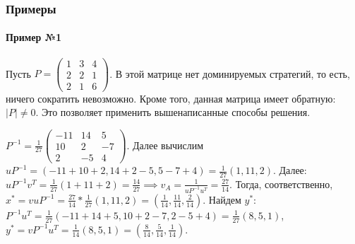 \documentclass{article}
\begin{document}
\subsubsection{Примеры}

\paragraph{Пример №1} Пусть $P = \begin{pmatrix}
    1 & 3 & 4 \\
    2 & 2 & 1 \\
    2 & 1 & 6
\end{pmatrix}$. В этой матрице нет доминируемых стратегий, то есть, ничего сократить невозможно. Кроме того, данная матрица имеет обратную: $|P| \ne 0$. Это позволяет применить вышенаписанные способы решения.

$P^{-1} = \frac{1}{27} \begin{pmatrix}
    -11 & 14 & 5 \\
    10 & 2 & -7 \\
    2 & -5 & 4
\end{pmatrix}$. Далее вычислим $u P^{-1} = (-11 + 10 + 2, 14 + 2 - 5, 5 - 7 + 4) = \frac{1}{27} (1, 11, 2)$. Далее: $u P^{-1} v^{T} = \frac{1}{27} (1 + 11 + 2) = \frac{14}{27} \implies v_{A} = \frac{1}{u P^{-1} u^{T}} = \frac{27}{14}$. Тогда, соответственно, $x^{*} = v u P^{-1} = \frac{27}{14} * \frac{1}{27} (1, 11, 2) = (\frac{1}{14}, \frac{11}{14}, \frac{2}{14})$. Найдем $y^{*}$: $P^{-1} u^{T} = \frac{1}{27} (-11 + 14 + 5, 10 + 2 - 7, 2 - 5 + 4) = \frac{1}{27} (8, 5, 1)$, $y^{*} = v P^{-1} u^{T} = \frac{1}{14} (8, 5, 1) = (\frac{8}{14}, \frac{5}{14}, \frac{1}{14})$.
\end{document}
